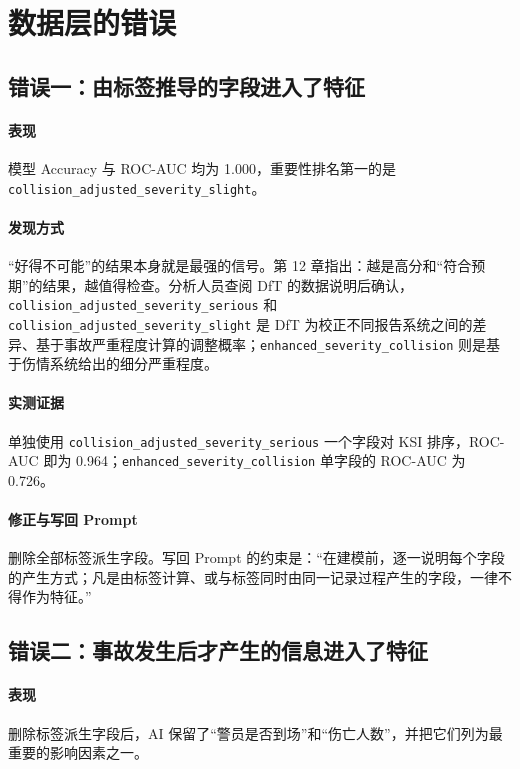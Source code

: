 \section{数据层的错误}

\subsection{错误一：由标签推导的字段进入了特征}

\paragraph{表现} 模型 Accuracy 与 ROC-AUC 均为 1.000，重要性排名第一的是 \texttt{collision\_adjusted\_severity\_slight}。

\paragraph{发现方式} “好得不可能”的结果本身就是最强的信号。第 12 章指出：越是高分和“符合预期”的结果，越值得检查。分析人员查阅 DfT 的数据说明后确认，\texttt{collision\_adjusted\_severity\_serious} 和 \texttt{collision\_adjusted\_severity\_slight} 是 DfT 为校正不同报告系统之间的差异、基于事故严重程度计算的调整概率\cite{dft2019severity}；\texttt{enhanced\_severity\_collision} 则是基于伤情系统给出的细分严重程度。

\paragraph{实测证据} 单独使用 \texttt{collision\_adjusted\_severity\_serious} 一个字段对 KSI 排序，ROC-AUC 即为 0.964；\texttt{enhanced\_severity\_collision} 单字段的 ROC-AUC 为 0.726。

\paragraph{修正与写回 Prompt} 删除全部标签派生字段。写回 Prompt 的约束是：“在建模前，逐一说明每个字段的产生方式；凡是由标签计算、或与标签同时由同一记录过程产生的字段，一律不得作为特征。”

\subsection{错误二：事故发生后才产生的信息进入了特征}

\paragraph{表现} 删除标签派生字段后，AI 保留了“警员是否到场”和“伤亡人数”，并把它们列为最重要的影响因素之一。

